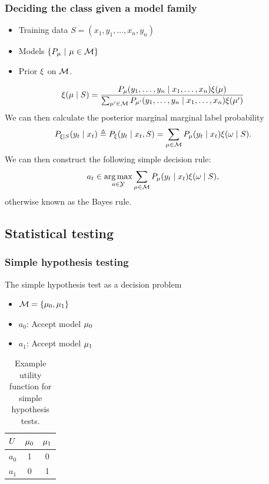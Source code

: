 \begin{frame}
  \frametitle{Deciding the class given a model family}
  \begin{itemize}
  \item Training data $S = (x_1, y_1, \ldots, x_n, y_n)$
  \item Models $\left\{P_\mu ~\middle|~ \mu \in {\mathcal{M}}\right\}$
  \item Prior $\xi$ on ${\mathcal{M}}$.
  \end{itemize}
  \[
    \xi(\mu \mid S)
    = \frac{P_\mu(y_1, \ldots, y_n \mid x_1, \ldots, x_n) \xi(\mu)}
    {\sum_{\mu' \in {\mathcal{M}}} P_{\mu'}(y_1, \ldots, y_n \mid x_1, \ldots, x_n) \xi(\mu')}
  \]
  We can then calculate the posterior marginal marginal label probability
  \[
    P_{\xi \mid S}(y_t \mid x_t) \mathrel{\triangleq}
    P_{\xi}(y_t \mid x_t, S) = 
    \sum_{\mu \in {\mathcal{M}}} P_\mu(y_t \mid x_t) \xi(\omega \mid S).
  \]
  We can then construct the following simple decision rule:
  \[
    a_t \in \mathop{\rm arg\,max}_{a \in {\mathcal{Y}}}\sum_{\mu \in {\mathcal{M}}} P_\mu(y_t \mid x_t) \xi(\omega \mid S),
  \]
  otherwise known as the \alert{Bayes rule}.
\end{frame}


\subsection{Statistical testing}
\begin{frame}
  \frametitle{Simple hypothesis testing}
\begin{block}{The simple hypothesis test as a decision problem}
  \begin{itemize}
  \item ${\mathcal{M}} = \{\mu_0, \mu_1\}$
  \item $a_0$: Accept model $\mu_0$
  \item $a_1$: Accept model $\mu_1$
  \end{itemize}
  \begin{table}[H]
  \begin{tabular}{c|cc}
    $U$& $\mu_0$& $\mu_1$\\\hline
    $a_0$ & 1 & 0\\
    $a_1$ & 0 & 1
  \end{tabular}
  \caption{Example utility function for simple hypothesis tests.}
\end{table}
\end{block}
\end{frame}


